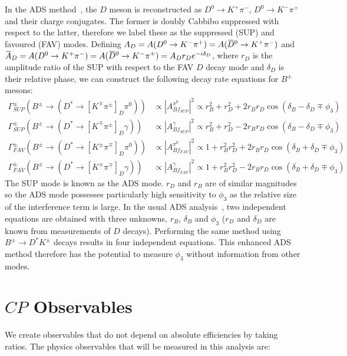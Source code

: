 \documentclass[oneside,12pt]{article}
\newcommand{\overbar}[1]{\mkern 1.5mu\overline{\mkern-1.5mu#1\mkern-1.5mu}\mkern
1.5mu}
\begin{document}
In the ADS method~\cite{ADSRef}, the $D$ meson is reconstructed as
$D^{0}\rightarrow K^{+}\pi^{-}$, $D^{0}\rightarrow K^{-}\pi^{+}$ and their
charge conjugates. The former is doubly Cabbibo suppressed with respect to the
latter, therefore we label these as the suppressed (SUP) and favoured (FAV)
modes. Defining $A_{D}=A(D^{0}\rightarrow
K^{-}\pi^{+})=A(\overbar{D}^{0}\rightarrow K^{+}\pi^{-})$ and $\overbar{A}_{D}=
A(D^{0}\rightarrow K^{+}\pi^{-})=A(\overbar{D}^{0}\rightarrow
K^{-}\pi^{+})=A_{D}r_{D}e^{-i\delta_{D}}$, where $r_{D}$ is the amplitude ratio
of the SUP with respect to the FAV $D$ decay mode and $\delta_{D}$ is their
relative phase, we can construct the following decay rate equations for
$B^{\pm}$ mesons:
  \begin{align*}
		\Gamma_{SUP}^{\pm}(B^{\pm}\rightarrow (D^{*}\rightarrow
[K^{\mp}\pi^{\pm}]_D\pi^{0})) &\propto |A^{\pi^0}_{Bf_{SUP}}|^2 \propto r_{B}^{2}
+ r_{D}^{2} + 2r_{B}r_{D}\cos(\delta_{B} - \delta_{D} \mp \phi_{3}) \\
		\Gamma_{SUP}^{\pm}(B^{\pm}\rightarrow (D^{*}\rightarrow
[K^{\mp}\pi^{\pm}]_D\gamma)) &\propto |A^{\gamma}_{Bf_{SUP}}|^2 \propto r_{B}^{2}
+ r_{D}^{2} - 2r_{B}r_{D}\cos(\delta_{B} - \delta_{D} \mp \phi_{3}) \\
		\Gamma_{FAV}^{\pm}(B^{\pm}\rightarrow (D^{*}\rightarrow
[K^{\pm}\pi^{\mp}]_D\pi^{0})) &\propto |A^{\pi^0}_{Bf_{FAV}}|^2 \propto 1 +
r_{B}^{2}r_{D}^{2} + 2r_{B}r_{D}\cos(\delta_{B} + \delta_{D} \mp \phi_{3}) \\
		\Gamma_{FAV}^{\pm}(B^{\pm}\rightarrow (D^{*}\rightarrow
[K^{\pm}\pi^{\mp}]_D\gamma)) &\propto |A^{\gamma}_{Bf_{FAV}}|^2 \propto 1 +
r_{B}^{2}r_{D}^{2} - 2r_{B}r_{D}\cos(\delta_{B} + \delta_{D} \mp \phi_{3})
  \end{align*}
\noindent The SUP mode is known as the ADS mode. $r_{D}$ and $r_{B}$ are of
similar magnitudes so the ADS mode possesses particularly high sensitivity to
$\phi_3$ as the relative size of the interference term is large. In the usual
ADS analysis~\cite{ADSRef}, two independent equations are obtained with three
unknowns, $r_B$, $\delta_B$ and $\phi_3$ ($r_{D}$ and $\delta_D$ are known from
measurements of $D$ decays). Performing the same method using
$B^{\pm}\rightarrow D^{*}K^{\pm}$ decays results in four independent equations. This
enhanced ADS method therefore has the potential to measure $\phi_3$ without
information from other modes.

\section{\normalsize $CP$ Observables}
We create observables that do not depend on absolute efficiencies by taking
ratios. The physics observables that will be measured in this analysis are:
\end{document}
